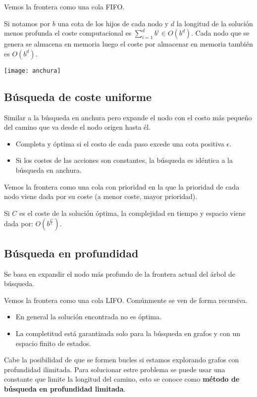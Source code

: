 \documentclass[12pt]{article}
\begin{document}
Vemos la frontera como una cola FIFO.

Si notamos por $b$ una cota de los hijos de cada nodo y $d$ la
longitud de la solución menos profunda el coste computacional es
$\sum_{i=1}^{d}b^i \in O(b^d)$. Cada nodo que se genera se almacena en
memoria luego el coste por almacenar en memoria también es $O(b^d)$.

\texttt{[image: anchura]}

\subsection{Búsqueda de coste uniforme}

Similar a la búsqueda en anchura pero expande el nodo con el costo 
más pequeño del camino que va desde el nodo origen hasta él.

\begin{itemize}
\item Completa y óptima si el costo de cada paso excede una cota positiva $\epsilon$.
\item Si los costes de las acciones son constantes, la búsqueda es idéntica 
  a la búsqueda en anchura.
\end{itemize}

Vemos la frontera como una cola con prioridad en la que la prioridad de cada 
nodo viene dada por su coste (a menor coste, mayor prioridad).

Si $C$ es el coste de la solución óptima, la complejidad en tiempo y espacio 
viene dada por: $O(b^{\frac{C}{\epsilon}})$.

\subsection{Búsqueda en profundidad}

Se basa en expandir el nodo más profundo de la frontera actual del
árbol de búsqueda.

Vemos la frontera como una cola LIFO. Comúnmente se ven de forma
recursiva.

\begin{itemize}
\item En general la solución encontrada no es óptima.
\item La completitud está garantizada solo para la búsqueda en grafos
  y con un espacio finito de estados.
\end{itemize}

Cabe la posibilidad de que se formen bucles si estamos explorando
grafos con profundidad ilimitada. Para solucionar estre problema se
puede usar una constante que limite la longitud del camino, esto se
conoce como \textbf{método de búsqueda en profundidad limitada}.
\end{document}

